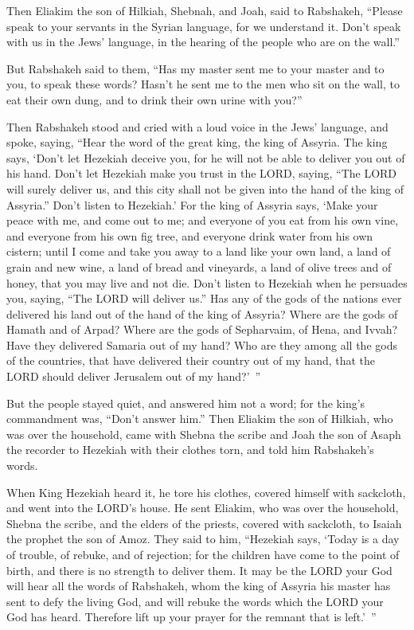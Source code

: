 \myverse{}Then Eliakim the son of Hilkiah, Shebnah, and Joah, said to
Rabshakeh, “Please speak to your servants in the Syrian language, for we understand it. Don’t speak with
us in the Jews’ language, in the hearing of the people who are on the wall.”

\myverse{}But Rabshakeh said to them, “Has my master sent me to your master
and to you, to speak these words? Hasn’t he sent me to the men who sit on the wall, to eat their own dung,
and to drink their own urine with you?”

\myverse{}Then Rabshakeh stood and cried with a loud voice in the Jews’
language, and spoke, saying, “Hear the word of the great king, the king of Assyria.
\myverse{}The king says, ‘Don’t let Hezekiah deceive you, for he will not be able to
deliver you out of his hand.
\myverse{}Don’t let Hezekiah make you trust in the LORD, saying, “The LORD will surely
deliver us, and this city shall not be given into the hand of the king of Assyria.”
\myverse{}Don’t listen to Hezekiah.’ For the king of Assyria says, ‘Make your peace
with me, and come out to me; and everyone of you eat from his own vine, and everyone from his own fig
tree, and everyone drink water from his own cistern;
\myverse{}until I come and take you away to a land like your own land, a land of grain
and new wine, a land of bread and vineyards, a land of olive trees and of honey, that you may live and
not die. Don’t listen to Hezekiah when he persuades you, saying, “The LORD will deliver us.”
\myverse{}Has any of the gods of the nations ever delivered his land out of the hand
of the king of Assyria?
\myverse{}Where are the gods of Hamath and of Arpad? Where are the gods of Sepharvaim,
of Hena, and Ivvah? Have they delivered Samaria out of my hand?
\myverse{}Who are they among all the gods of the countries, that have delivered their
country out of my hand, that the LORD should deliver Jerusalem out of my hand?’ ”

\myverse{}But the people stayed quiet, and answered him not a word; for
the king’s commandment was, “Don’t answer him.”
\myverse{}Then Eliakim the son of Hilkiah, who was over the household, came with Shebna
the scribe and Joah the son of Asaph the recorder to Hezekiah with their clothes torn, and told him Rabshakeh’s
words.


\mychapter{} \myverse*{}When King Hezekiah heard it, he tore his clothes, covered himself
with sackcloth, and went into the LORD’s house.
\myverse{}He sent Eliakim, who was over the household, Shebna the scribe, and the elders
of the priests, covered with sackcloth, to Isaiah the prophet the son of Amoz.
\myverse{}They said to him, “Hezekiah says, ‘Today is a day of trouble, of rebuke, and
of rejection; for the children have come to the point of birth, and there is no strength to deliver them.
\myverse{}It may be the LORD your God will hear all the words of Rabshakeh, whom the
king of Assyria his master has sent to defy the living God, and will rebuke the words which the LORD your
God has heard. Therefore lift up your prayer for the remnant that is left.’ ”

